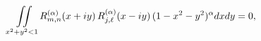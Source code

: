 \[\iint\limits_{x^{2}+y^{2}<1}\mathop{R^{(\alpha)}_{m,n}\/}\nolimits\!\left(x+iy%
\right)\mathop{R^{(\alpha)}_{j,\ell}\/}\nolimits\!\left(x-iy\right)\*(1-x^{2}-%
y^{2})^{\alpha}dxdy=0,\]